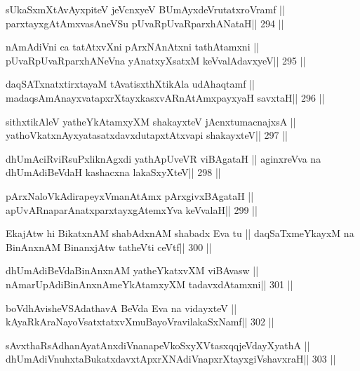 \begin{shl}
sUkaSxmXtAvAyxpiteV jeVcnxyeV BUmAyxdeVrutatxroVramf ||
parxtayxgAtAmxvasAneVSu pUvaRpUvaRparxhANataH\hfill || 294 ||
\end{shl}

\begin{shl}
nAmAdiVni ca tatAtxvXni pArxNAnAtxni tathA\s\s tamxni ||
pUvaRpUvaRparxhANeVna yAnatxyXsatxM keVvalAdavxyeV\hfill || 295 ||
\end{shl}

\begin{shl}
daqSATxnatxtirxtayaM tAvatisxthXtikAla udAhaqtamf ||
madaqsAmAnayxvatapxrXtayxkasxvARnAtAmxpayxyaH savxtaH\hfill || 296 ||
\end{shl}

\begin{shl}
sithxtikAleV yatheYkAtamxyXM shakayxteV jAcnxtumacnajxsA ||
yathoVkatxnAyxyatasatxdavxdutapxtAtxvapi shakayxteV\hfill || 297 ||
\end{shl}

\begin{shl}
dhUmAciRviRsuPxliknAgxdi yathApUveVR viBAgataH ||
aginxreVva na dhUmAdiBeVdaH kashacxna lakaSxyXteV\hfill || 298 ||
\end{shl}

\begin{shl}
pArxNaloVkAdirapeyxVmanAtAmx pArxgivxBAgataH ||
apUvARnaparAnatxparxtayxgAtemxYva keVvalaH\hfill || 299 ||
\end{shl}

\begin{shl}
EkajAtw hi BikatxnAM shabAdxnAM shabadx Eva tu ||
daqSaTxmeYkayxM na BinAnxnAM BinanxjAtw tatheVti ceVtf\hfill || 300 ||
\end{shl}

\begin{shl}
dhUmAdiBeVdaBinAnxnAM yatheYkatxvXM viBAvasw ||
nAmarUpAdiBinAnxnAmeYkAtamxyXM tadavxdAtamxni\hfill || 301 ||
\end{shl}

\begin{shl}
boVdhAvisheVSAdathavA BeVda Eva na vidayxteV ||
kAyaRkAraNayoVsatxtatxvXmuBayoVravilakaSxNamf\hfill || 302 ||
\end{shl}

\begin{shl}
sAvxthaRsAdhanAyatAnxdiVnanapeVkoSxyXVtasxqqjeVdayXyathA ||
dhUmAdiVnuhxtaBukatxdavxtApxrXNAdiVnapxrXtayxgiVshavxraH\hfill || 303 ||
\end{shl}


